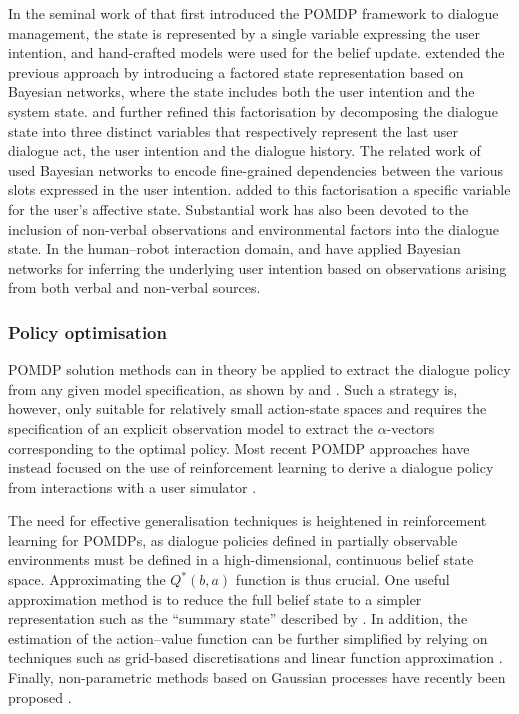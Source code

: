 In the seminal work of \cite{Roy:2000} that first introduced the POMDP framework to dialogue management, the state is represented by a single variable expressing the user intention, and hand-crafted models were used for the belief update. \cite{zhang2001} extended the previous approach by introducing a factored state representation based on Bayesian networks, where the state includes both the user intention and the system state. \cite{williams2005factored} and \cite{Young:2010} further refined this factorisation by decomposing the dialogue state into three distinct variables that respectively represent the last user dialogue act, the user intention and the dialogue history. The related work of \cite{Thomson:2010:BUD:1772996.1773040} used Bayesian networks to encode fine-grained dependencies between the various slots expressed in the user intention. \cite{bui2009} added to this factorisation a specific variable for the user's affective state. Substantial work has also been devoted to the inclusion of non-verbal observations and environmental factors into the dialogue state. In the human--robot interaction domain, \cite{prodanov2003bayesian} and \cite{Hong:2007} have applied Bayesian networks for inferring the underlying user intention based on observations arising from both verbal and non-verbal sources. 

\subsubsection*{Policy optimisation}

POMDP solution methods can in theory be applied to extract the dialogue policy from any given model specification, as shown by \cite{Williams:2007} and \cite{Williamsetal:2008}.  Such a strategy is, however, only suitable for relatively small action-state spaces and requires the specification of an explicit observation model to extract the $\alpha$-vectors corresponding to the optimal policy. Most recent POMDP approaches have instead focused on the use of reinforcement learning to derive a dialogue policy from interactions with a user simulator \citep{Young:2010,Thomson:2010:BUD:1772996.1773040, daubigney2012}.

The need for effective generalisation techniques is heightened in reinforcement learning for POMDPs, as dialogue policies defined in partially observable environments must be defined in a high-dimensional, continuous belief state space.  Approximating the $Q^*(b,a)$ function is thus crucial. One useful approximation method is to reduce the full belief state to a simpler representation such as the ``summary state'' described by \cite{williams2005}. In addition, the estimation of the action--value function can be further simplified by relying on techniques such as grid-based discretisations \citep{Young:2010} and linear function approximation  \citep{Thomson:2010:BUD:1772996.1773040, daubigney2012}. Finally, non-parametric methods based on Gaussian processes have recently been proposed \citep{milica2013}. 

